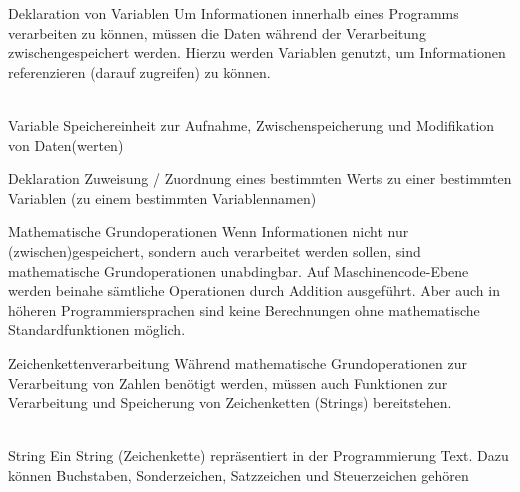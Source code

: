     
    \begin{frame}{Deklaration von Variablen}
        Um Informationen innerhalb eines Programms verarbeiten zu können, müssen die Daten während der Verarbeitung zwischengespeichert werden. Hierzu werden Variablen genutzt, um Informationen referenzieren (darauf zugreifen) zu können. \\~\
        
        \begin{block}{Variable}
            Speichereinheit zur Aufnahme, Zwischenspeicherung und Modifikation von Daten(werten)
        \end{block}
        
        \begin{block}{Deklaration}
            Zuweisung / Zuordnung eines bestimmten Werts zu einer bestimmten Variablen (zu einem bestimmten Variablennamen)
        \end{block}
        
    \end{frame}
    
    \begin{frame}{Mathematische Grundoperationen}
        Wenn Informationen nicht nur (zwischen)gespeichert, sondern auch verarbeitet werden sollen, sind mathematische Grundoperationen unabdingbar. Auf Maschinencode-Ebene werden beinahe sämtliche Operationen durch Addition ausgeführt. Aber auch in höheren Programmiersprachen sind keine Berechnungen ohne mathematische Standardfunktionen möglich.
        
    \end{frame}
    
    \begin{frame}{Zeichenkettenverarbeitung}
        Während mathematische Grundoperationen zur Verarbeitung von Zahlen benötigt werden, müssen auch Funktionen zur Verarbeitung und Speicherung von Zeichenketten (Strings) bereitstehen. \\~\
        
        \begin{block}{String}
            Ein String (Zeichenkette) repräsentiert in der Programmierung Text. Dazu können Buchstaben, Sonderzeichen, Satzzeichen und Steuerzeichen gehören
        \end{block}
        
    \end{frame}
    
